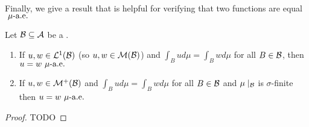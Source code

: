 Finally, we give a result that is helpful for verifying that two functions are equal $\ \mu\text{-a.e. }$

\begin{cor}
	Let $\mathcal{B} \subseteq \mathcal{A}$ be a \siga.
	
	\begin{enumerate}
		\item If $u, w \in \mathcal{L}^1(\mathcal{B})$ (so $u, w \in \mathcal{M}(\mathcal{B})$) and $\int_B u d\mu = \int_B w d\mu$ for all $B \in \mathcal{B}$, then $u = w\ \mu\text{-a.e. }$
		
		\item If $u, w \in \mathcal{M}^+(\mathcal{B})$ and $\int_B u d\mu = \int_B w d\mu$ for all $B \in \mathcal{B}$ and $\mu\mid_{\mathcal{B}}$ is $\sigma$-finite then $u = w \ \mu\text{-a.e. }$
	\end{enumerate}
\end{cor}

\begin{proof}
	TODO
\end{proof}